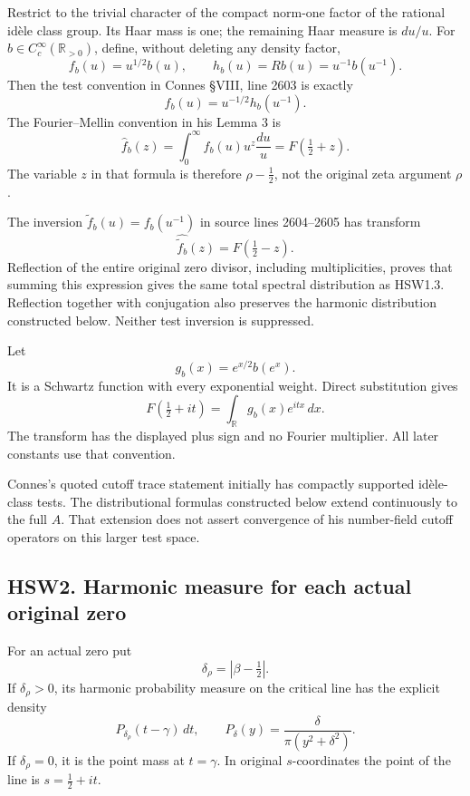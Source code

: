 Restrict to the trivial character of the compact norm-one factor of the
rational idèle class group. Its Haar mass is one; the remaining Haar
measure is \(du/u\). For \(b\in C_c^\infty(\mathbb R_{>0})\), define,
without deleting any density factor, \[
f_b(u)=u^{1/2}b(u),\qquad
h_b(u)=Rb(u)=u^{-1}b(u^{-1}).
\tag{HSW1.1}
\] Then the test convention in Connes §VIII, line 2603 is exactly \[
f_b(u)=u^{-1/2}h_b(u^{-1}).
\tag{HSW1.2}
\] The Fourier--Mellin convention in his Lemma 3 is \[
\widehat f_b(z)=\int_0^\infty f_b(u)u^z\frac{du}{u}
=F(\tfrac12+z).
\tag{HSW1.3}
\] The variable \(z\) in that formula is therefore \(\rho-\tfrac12\),
not the original zeta argument \(\rho\).

The inversion \(\widetilde f_b(u)=f_b(u^{-1})\) in source lines
2604--2605 has transform \[
\widehat{\widetilde f_b}(z)=F(\tfrac12-z).
\tag{HSW1.4}
\] Reflection of the entire original zero divisor, including
multiplicities, proves that summing this expression gives the same total
spectral distribution as HSW1.3. Reflection together with conjugation
also preserves the harmonic distribution constructed below. Neither test
inversion is suppressed.

Let \[
g_b(x)=e^{x/2}b(e^x).
\] It is a Schwartz function with every exponential weight. Direct
substitution gives \[
F(\tfrac12+it)=\int_{\mathbb R}g_b(x)e^{itx}\,dx.
\tag{HSW1.5}
\] The transform has the displayed plus sign and no Fourier multiplier.
All later constants use that convention.

Connes's quoted cutoff trace statement initially has compactly supported
idèle-class tests. The distributional formulas constructed below extend
continuously to the full \(A\). That extension does not assert
convergence of his number-field cutoff operators on this larger test
space.

\subsection{HSW2. Harmonic measure for each actual original
zero}\label{hsw2.-harmonic-measure-for-each-actual-original-zero}

For an actual zero put \[
\delta_\rho=|\beta-\tfrac12|.
\] If \(\delta_\rho>0\), its harmonic probability measure on the
critical line has the explicit density \[
P_{\delta_\rho}(t-\gamma)\,dt,\qquad
P_\delta(y)=\frac{\delta}{\pi(y^2+\delta^2)}.
\tag{HSW2.1}
\] If \(\delta_\rho=0\), it is the point mass at \(t=\gamma\). In
original \(s\)-coordinates the point of the line is \(s=\tfrac12+it\).

